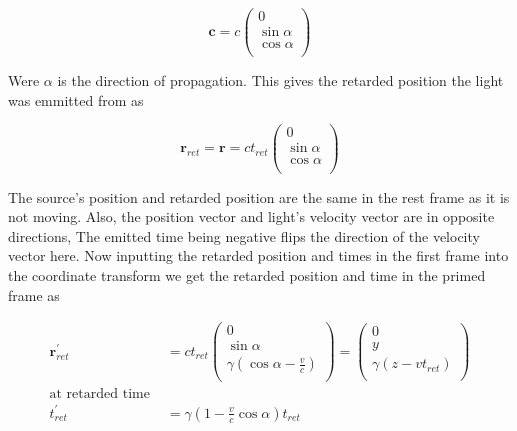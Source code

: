 \begin{equation}
	\mathbf{c} = {c}
	\begin{pmatrix}
		0            \\
		\sin{\alpha} \\
		\cos{\alpha} \\
	\end{pmatrix}
\end{equation}

Were ${\alpha}$ is the direction of propagation.
This gives the retarded position the light was emmitted from as

\begin{equation}
	\mathbf{r}_{ret} = \mathbf{r} ={c}{{{t}_{ret}}}
	\begin{pmatrix}
		0            \\
		\sin{\alpha} \\
		\cos{\alpha} \\
	\end{pmatrix}
\end{equation}

The source's position and retarded position are the same in the rest frame as it is not moving.
Also, the position vector and light's velocity vector are in opposite directions, The emitted time being negative flips the direction of the velocity vector here.
Now inputting the retarded position and times in the first frame into the coordinate transform we get the retarded position and time in the primed frame as

\begin{equation}
	\begin{aligned}
		\mathbf{r}_{ret}^{'}     & = {c}{{t}_{ret}}
		\begin{pmatrix}
			0                                                \\
			\sin{\alpha}                                     \\
			{\gamma} \left( \cos{\alpha}-\frac{v}{c} \right) \\
		\end{pmatrix}
		=
		\begin{pmatrix}
			0                                             \\
			{y}                                           \\
			{\gamma} \left( {z}-{v} {{{t}_{ret}}} \right) \\
		\end{pmatrix}
		\\
		\text{at retarded time } &
		\\ {{t}_{ret}^{'}} & = {\gamma} \left(1-\frac{v}{c} \cos{\alpha} \right) {{{t}_{ret}}}
	\end{aligned}
\end{equation}

